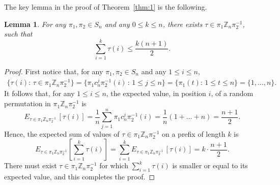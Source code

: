 \documentclass[11pt]{amsart}
\newtheorem{lemma}[theorem]{Lemma}
\numberwithin{equation}{section}
\newcommand{\ZZ}{{\mathbb {Z}}}
\begin{document}
The key lemma in the proof of Theorem~\ref{thm:1} is the following.  

\begin{lemma}\label{lem:3}
    For 
    any $\pi_1,\pi_2 \in S_n$ and 
    any $0 \le k \le n$, there exists $\tau \in \pi_1 \ZZ_n \pi_2^{-1}$,  such that
    \[
        \sum_{i=1}^k \tau(i)
        \le \frac{k(n+1)}{2}. 
    \]
\end{lemma}

\begin{proof}
First notice that, for any $\pi_1, \pi_2 \in S_n$ and any $1\le i\le n$,
\begin{align*}
    \{\tau(i) :\, \tau \in \pi_1 \ZZ_n \pi_2^{-1}\}
    = \{\pi_1 c_n^j \pi_2^{-1}(i) \,:\, 1\le j \le n\} %
    = \{\pi_1(t) :\, 1\le t \le n\}
    = \{1,\dots,n\}.
\end{align*}
It follows that, for any $1 \le i \le n$, the expected value, in position $i$, of a random permutation in $\pi_1 \ZZ_n \pi_2^{-1}$ is  
\[
    E_{\tau \in \pi_1 \ZZ_n \pi_2^{-1}} \, [\tau(i)]
    = \frac{1}{n}\sum_{j=1}^n \pi_1 c_n^j \pi_2^{-1}(i)
    = \frac{1}{n} (1 + \dots + n) 
    = \frac{n+1}{2}.
\]
Hence, the expected sum of values of $\tau \in \pi_1 \ZZ_n \pi_2^{-1}$ on a prefix of length $k$ is  
\[
    E_{\tau \in  \pi_1 \ZZ_n \pi_2^{-1}} \left[ \sum_{i=1}^k \tau(i) \right]
    = \sum_{i=1}^k E_{\tau \in  \pi_1 \ZZ_n \pi_2^{-1}} \,[\tau(i)]
    = k\cdot \frac{n+1}{2}.
\]    
There must exist $\tau \in \pi_1 \ZZ_n \pi_2^{-1}$ for which $\sum_{i=1}^k \tau(i)$ is smaller or equal to its expected value, and this completes the proof. 
\end{proof}
\end{document}
